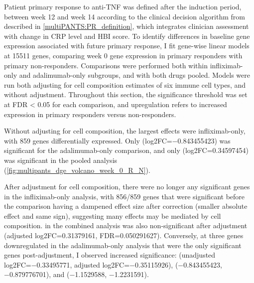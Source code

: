 \begin{outline}

Patient primary response to anti-\gls{TNF} was defined after the induction period, between week 12 and week 14 according to the clinical decision algorithm from \textcite{kennedy2019PredictorsAntiTNFTreatment} described in \autoref{multiPANTS:PR_definition}, 
which integrates clinician assessment with change in \gls{CRP} level and \gls{HBI} score.
To identify differences in baseline gene expression associated with future primary response, 
I fit gene-wise linear models at 15511 genes, comparing week 0 gene expression in primary responders with primary non-responders.
Comparisons were performed both within infliximab-only and adalimumab-only subgroups, and with both drugs pooled.
Models were run both adjusting for cell composition estimates of six immune cell types, and without adjustment.
Throughout this section, the significance threshold was set at FDR < 0.05 for each comparison, and upregulation refers to increased expression in primary responders versus non-responders.

Without adjusting for cell composition, the largest effects were infliximab-only, with 859 genes differentially expressed.
Only  (log2FC=\num{-0.843455423}) was significant for the adalimumab-only comparison, 
and only  (log2FC=\num{0.34597454}) was significant in the pooled analysis (\autoref{fig:multipants_dge_volcano_week_0_R_N}).

After adjustment for cell composition, there were no longer any significant genes in the infliximab-only analysis, 
with 856/859 genes that were significant before the comparison having a dampened effect size after correction (smaller absolute effect and same sign), suggesting many effects may be mediated by cell composition.
 in the combined analysis was also non-significant after adjustment (adjusted log2FC=\num{0.31379161}, FDR=\num{0.050291627}).
Conversely, at three genes downregulated in the adalimumab-only analysis that were the only significant genes post-adjustment, I observed increased significance:
 (unadjusted log2FC=\num{-0.33495771}, adjusted log2FC=\num{-0.35115926}), 
 (\num{-0.843455423}, \num{-0.879776701}), 
and  (\num{-1.1529588}, \num{-1.2231591}).


\end{outline}
